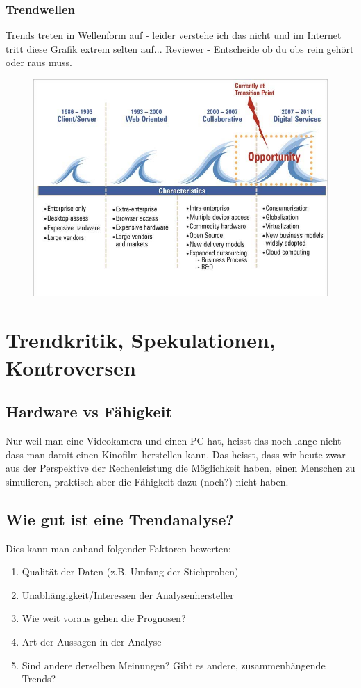 \subsubsection{Trendwellen}
Trends treten in Wellenform auf - leider verstehe ich das nicht und im Internet tritt diese Grafik extrem selten auf...
Reviewer - Entscheide ob du obs rein gehört oder raus muss.
\begin{figure}
\centering
\includegraphics[width=0.7\linewidth]{fig/waves}
\caption{}
\label{fig:waves}
\end{figure}

\section{Trendkritik, Spekulationen, Kontroversen}
\subsection{Hardware vs Fähigkeit}
Nur weil man eine Videokamera und einen PC hat, heisst das noch lange nicht dass man damit einen Kinofilm herstellen kann. Das heisst, dass wir heute zwar aus der Perspektive der Rechenleistung die Möglichkeit haben, einen Menschen zu simulieren, praktisch aber die Fähigkeit dazu (noch?) nicht haben.
\subsection{Wie gut ist eine Trendanalyse?}
Dies kann man anhand folgender Faktoren bewerten:
\begin{enumerate}
	\item Qualität der Daten (z.B. Umfang der Stichproben)
	\item Unabhängigkeit/Interessen der Analysenhersteller
	\item Wie weit voraus gehen die Prognosen?
	\item Art der Aussagen in der Analyse
	\item Sind andere derselben Meinungen? Gibt es andere, zusammenhängende Trends?
\end{enumerate}

